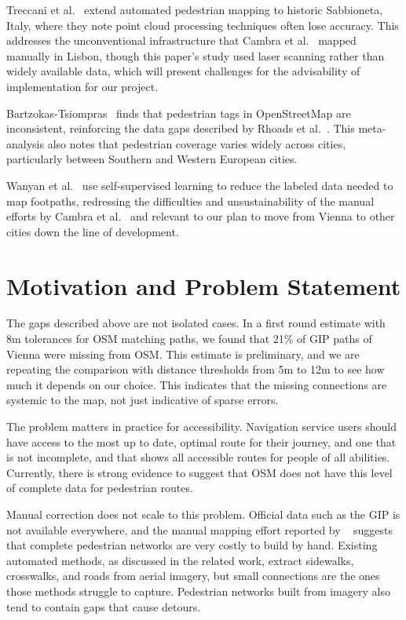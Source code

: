 \documentclass[conference]{IEEEtran}
\begin{document}
Treccani et al.~\cite{treccani2023} extend automated pedestrian mapping to historic Sabbioneta, Italy, where they note point cloud processing techniques often lose accuracy. This addresses the unconventional infrastructure that Cambra et al.~\cite{cambra2019} mapped manually in Lisbon, though this paper's study used laser scanning rather than widely available data, which will present challenges for the advisability of implementation for our project.

Bartzokas-Tsiompras~\cite{bartzokas2022} finds that pedestrian tags in OpenStreetMap are inconsistent, reinforcing the data gaps described by Rhoads et al.~\cite{rhoads2023}. This meta-analysis also notes that pedestrian coverage varies widely across cities, particularly between Southern and Western European cities.

Wanyan et al.~\cite{wanyan2023} use self-supervised learning to reduce the labeled data needed to map footpaths, redressing the difficulties and unsustainability of the manual efforts by Cambra et al.~\cite{cambra2019} and relevant to our plan to move from Vienna to other cities down the line of development.


\section{Motivation and Problem Statement}

The gaps described above are not isolated cases. In a first round estimate with 8m tolerances for OSM matching paths, we found that 21\% of GIP paths of Vienna were missing from OSM. This estimate is preliminary, and we are repeating the comparison with distance thresholds from 5m to 12m to see how much it depends on our choice. This indicates that the missing connections are systemic to the map, not just indicative of sparse errors. 

The problem matters in practice for accessibility. Navigation service users should have access to the most up to date, optimal route for their journey, and one that is not incomplete, and that shows all accessible routes for people of all abilities. Currently, there is strong evidence to suggest that OSM does not have this level of complete data for pedestrian routes.

Manual correction does not scale to this problem. Official data such as the GIP is not available everywhere, and the manual mapping effort reported by ~\cite{cambra2019} suggests that complete pedestrian networks are very costly to build by hand. Existing automated methods, as discussed in the related work, extract sidewalks, crosswalks, and roads from aerial imagery, but small connections are the ones those methods struggle to capture. Pedestrian networks built from imagery also tend to contain gaps that cause detours.
\end{document}
